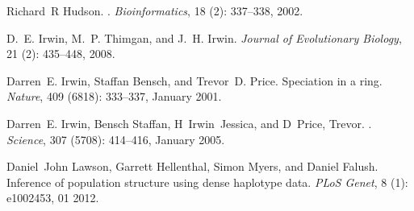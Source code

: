 \documentclass[10pt,letterpaper]{article}
\begin{document}
\begin{thebibliography}{80}
Richard~R Hudson.
.
\newblock \emph{Bioinformatics}, 18 (2): 337--338, 2002.

D.~E. Irwin, M.~P. Thimgan, and J.~H. Irwin.
\newblock \emph{Journal of Evolutionary Biology}, 21 (2):
  435--448, 2008.

Darren~E. Irwin, Staffan Bensch, and Trevor~D. Price.
\newblock Speciation in a ring.
\newblock \emph{Nature}, 409 (6818): 333--337, January 2001.

Darren~E. Irwin, Bensch Staffan, H~Irwin~Jessica, and D~Price, Trevor.
.
\newblock \emph{Science}, 307 (5708): 414--416, January 2005.

Daniel~John Lawson, Garrett Hellenthal, Simon Myers, and Daniel Falush.
\newblock Inference of population structure using dense haplotype data.
\newblock \emph{PLoS Genet}, 8 (1): e1002453, 01 2012.


\end{thebibliography}
\end{document}
